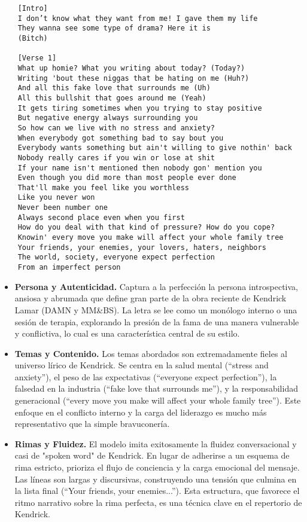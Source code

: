 \documentclass[paper=letter, fontsize=11pt, draft=false]{scrartcl}
\numberwithin{equation}{section} %
\numberwithin{figure}{section} %
\numberwithin{table}{section} %
\numberwithin{subsection}{section}
\begin{document}
\begin{verbatim}
    [Intro]
    I don’t know what they want from me! I gave them my life
    They wanna see some type of drama? Here it is
    (Bitch)

    [Verse 1]
    What up homie? What you writing about today? (Today?)
    Writing 'bout these niggas that be hating on me (Huh?)
    And all this fake love that surrounds me (Uh)
    All this bullshit that goes around me (Yeah)
    It gets tiring sometimes when you trying to stay positive
    But negative energy always surrounding you
    So how can we live with no stress and anxiety?
    When everybody got something bad to say bout you
    Everybody wants something but ain't willing to give nothin' back
    Nobody really cares if you win or lose at shit
    If your name isn't mentioned then nobody gon' mention you
    Even though you did more than most people ever done
    That'll make you feel like you worthless
    Like you never won
    Never been number one
    Always second place even when you first
    How do you deal with that kind of pressure? How do you cope?
    Knowin' every move you make will affect your whole family tree
    Your friends, your enemies, your lovers, haters, neighbors
    The world, society, everyone expect perfection
    From an imperfect person
\end{verbatim}
\begin{itemize}
    \item \textbf{Persona y Autenticidad.} Captura a la perfección la persona introspectiva, ansiosa y abrumada que define gran parte de la obra reciente de Kendrick Lamar (DAMN y MM\&BS). La letra se lee como un monólogo interno o una sesión de terapia, explorando la presión de la fama de una manera vulnerable y conflictiva, lo cual es una característica central de su estilo.

    \item \textbf{Temas y Contenido.} Los temas abordados son extremadamente fieles al universo lírico de Kendrick. Se centra en la salud mental (``stress and anxiety''), el peso de las expectativas (``everyone expect perfection''), la falsedad en la industria (``fake love that surrounds me''), y la responsabilidad generacional (``every move you make will affect your whole family tree''). Este enfoque en el conflicto interno y la carga del liderazgo es mucho más representativo que la simple bravuconería.

    \item \textbf{Rimas y Fluidez.} El modelo imita exitosamente la fluidez conversacional y casi de "spoken word" de Kendrick. En lugar de adherirse a un esquema de rima estricto, prioriza el flujo de conciencia y la carga emocional del mensaje. Las líneas son largas y discursivas, construyendo una tensión que culmina en la lista final (``Your friends, your enemies...''). Esta estructura, que favorece el ritmo narrativo sobre la rima perfecta, es una técnica clave en el repertorio de Kendrick.
\end{itemize}
\end{document}
